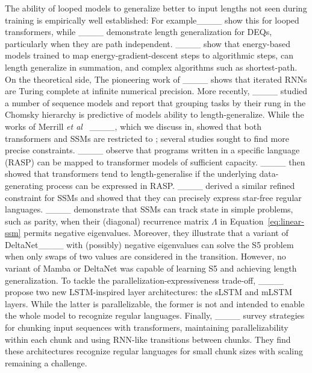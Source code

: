 The ability of looped models to generalize better to input lengths not seen during training is empirically well established: For example____ show this for looped transformers, while ____ demonstrate length generalization for DEQs, particularly when they are path independent.
____ show that energy-based models trained to map energy-gradient-descent steps to algorithmic steps, can length generalize in summation, and complex algorithms such as shortest-path.
On the theoretical side,
The pioneering work of ____ shows that iterated RNNs are Turing complete at infinite numerical precision. 
More recently, ____ studied a number of sequence models and report that grouping tasks by their rung in the Chomsky hierarchy is predictive of models ability to length-generalize. 
While the works of Merrill \emph{et al}~ ____, which we discuss in, showed that both transformers and SSMs are restricted to \tc; several studies sought to find more precise constraints.
____ observe that programs written in a specific language (RASP) can be mapped to transformer models of sufficient capacity.
____ then showed that transformers tend to length-generalise if the underlying data-generating process can be expressed in RASP.
____ derived a similar refined constraint for SSMs and showed that they can precisely express star-free regular languages.
____ demonstrate that SSMs can track state in simple problems, such as parity, when their (diagonal) recurrence matrix \(\Lambda\) in Equation~\eqref{eq:linear-ssm} permits negative eigenvalues.
Moreover, they illustrate that a variant of DeltaNet____ with (possibly) negative eigenvalues can solve the S5 problem when only swaps of two values are considered in the transition.
However, no variant of Mamba or DeltaNet was capable of learning S5 and achieving length generalization.
To tackle the parallelization-expressiveness trade-off, ____ propose two new LSTM-inspired layer architectures: the sLSTM and mLSTM layers.
While the latter is parallelizable, the former is not and intended to enable the whole model to recognize regular languages.
Finally, ____ survey strategies for chunking input sequences with transformers, maintaining parallelizability within each chunk and using RNN-like transitions between chunks.
They find these architectures recognize regular languages for small chunk sizes with scaling remaining a challenge.